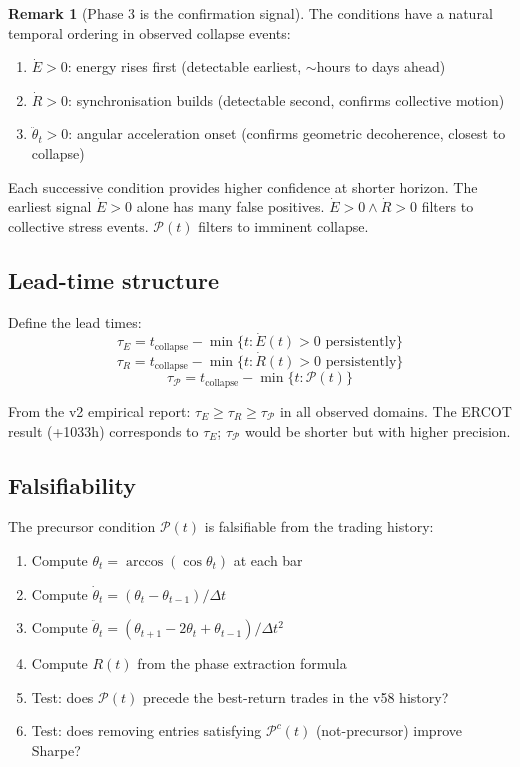 \documentclass[11pt,a4paper]{article}
\theoremstyle{definition}
\newtheorem{remark}[theorem]{Remark}
\begin{document}
\begin{remark}[Phase 3 is the confirmation signal]
The conditions have a natural temporal ordering in observed collapse events:
\begin{enumerate}
\item $\dot E > 0$: energy rises first (detectable earliest, $\sim$hours to days ahead)
\item $\dot R > 0$: synchronisation builds (detectable second, confirms collective motion)
\item $\ddot\theta_t > 0$: angular acceleration onset (confirms geometric decoherence, closest to collapse)
\end{enumerate}
Each successive condition provides higher confidence at shorter horizon.
The earliest signal $\dot E > 0$ alone has many false positives.
$\dot E > 0 \wedge \dot R > 0$ filters to collective stress events.
$\mathcal{P}(t)$ filters to imminent collapse.
\end{remark}

\subsection{Lead-time structure}

Define the lead times:
\[
\tau_E = t_\text{collapse} - \min\{t : \dot E(t) > 0\text{ persistently}\}
\]
\[
\tau_R = t_\text{collapse} - \min\{t : \dot R(t) > 0\text{ persistently}\}
\]
\[
\tau_\mathcal{P} = t_\text{collapse} - \min\{t : \mathcal{P}(t)\}
\]

From the v2 empirical report: $\tau_E \geq \tau_R \geq \tau_\mathcal{P}$ in all observed domains.
The ERCOT result (+1033h) corresponds to $\tau_E$; $\tau_\mathcal{P}$ would be shorter but with higher precision.

\subsection{Falsifiability}

The precursor condition $\mathcal{P}(t)$ is falsifiable from the trading history:

\begin{enumerate}
\item Compute $\theta_t = \arccos(\cos\theta_t)$ at each bar
\item Compute $\dot\theta_t = (\theta_t - \theta_{t-1})/\Delta t$
\item Compute $\ddot\theta_t = (\theta_{t+1} - 2\theta_t + \theta_{t-1})/\Delta t^2$
\item Compute $R(t)$ from the phase extraction formula
\item Test: does $\mathcal{P}(t)$ precede the best-return trades in the v58 history?
\item Test: does removing entries satisfying $\mathcal{P}^c(t)$ (not-precursor) improve Sharpe?
\end{enumerate}
\end{document}
